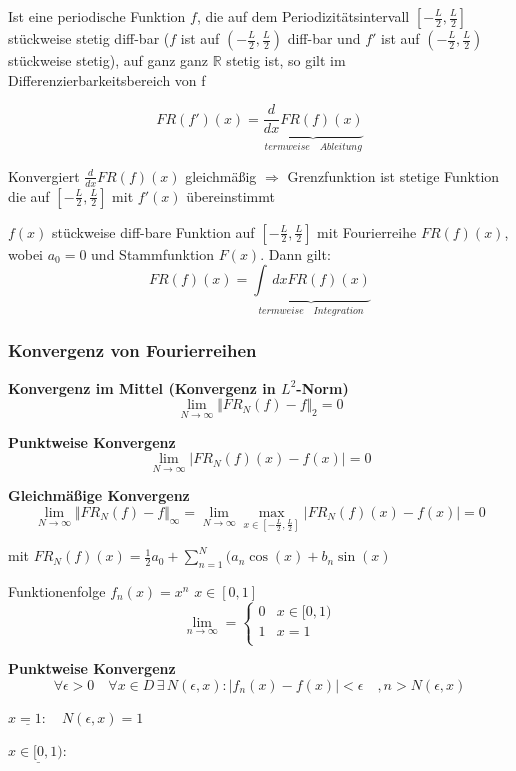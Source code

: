 \begin{Satz}
	Ist eine periodische Funktion $f$, die auf dem Periodizitätsintervall
	$[-\frac{L}{2}, \frac{L}{2}]$ stückweise stetig diff-bar ($f$ ist auf
	$(-\frac{L}{2}, \frac{L}{2})$ diff-bar und $f'$ ist auf $(-\frac{L}{2}, \frac{L}{2})$
	stückweise stetig), auf ganz ganz $\mathbb{R}$ stetig ist, so gilt im
	Differenzierbarkeitsbereich von f

	$$FR(f')(x) = \underbrace{\frac{d}{dx}FR(f)(x)}_{termweise \quad Ableitung}$$

\end{Satz}

\begin{Bem}
	Konvergiert $\frac{d}{dx} FR(f)(x)$ gleichmäßig $\Rightarrow$
	Grenzfunktion ist stetige Funktion die auf $[-\frac{L}{2}, \frac{L}{2}]$
	mit $f'(x)$ übereinstimmt
\end{Bem}

\begin{Satz}
	$f(x)$ stückweise diff-bare Funktion auf $[-\frac{L}{2}, \frac{L}{2}]$ mit
	Fourierreihe $FR(f)(x)$, wobei $a_0 = 0$ und Stammfunktion $F(x)$.
	Dann gilt:
	$$FR(f)(x) = \underbrace{\int \,dx FR(f)(x)}_{termweise \quad Integration} $$
\end{Satz}

\subsubsection{Konvergenz von Fourierreihen}
\textbf{Konvergenz im Mittel (Konvergenz in $L^2$-Norm)}
$$\lim_{N \rightarrow \infty} \Vert FR_N(f)-f \Vert_2 = 0$$

\textbf{Punktweise Konvergenz}
$$\lim_{N \rightarrow \infty} \vert FR_N(f)(x)-f(x) \vert = 0$$

\textbf{Gleichmäßige Konvergenz}
$$\lim_{N \rightarrow \infty} \Vert FR_N(f)-f \Vert_\infty = \lim_{N \rightarrow \infty} 
\max_{x \in [-\frac{L}{2} , \frac{L}{2}]} \vert FR_N(f)(x)-f(x) \vert = 0$$

mit $FR_N(f)(x) = \frac{1}{2} a_0 + \sum_{n=1}^N(a_n \cos(x) + b_n \sin(x)$


\begin{Bsp}{Funktionenfolge $f_n(x)=x^n$ \qquad $x \in [0,1]$}
	$$
	\lim_{n \rightarrow \infty} = \left\{ \begin{array}{ll}
        0 & x \in [0,1) \\
        1 & x = 1 \\
        \end{array}
		\right.
	$$

	\textbf{Punktweise Konvergenz}
	$$\forall \epsilon > 0 \quad \forall x \in D \, \exists \, N(\epsilon, x) :
		\vert f_n(x)-f(x) \vert < \epsilon \quad, n > N(\epsilon,x)$$

	$ \underline{x = 1:} \quad N(\epsilon,x) = 1$

	$ \underline{x \in [0,1):}$

\end{Bsp} 


